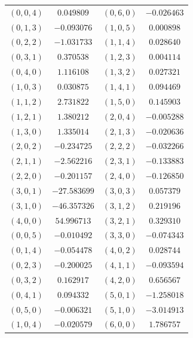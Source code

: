 \begin{table}
\begin{tabular}{cc@{\qquad}cc}
$(0,0,4)$ & $0.049809$ & $(0,6,0)$ & $-0.026463$ \\
$(0,1,3)$ & $-0.093076$ & $(1,0,5)$ & $0.000898$ \\
$(0,2,2)$ & $-1.031733$ & $(1,1,4)$ & $0.028640$ \\
$(0,3,1)$ & $0.370538$ & $(1,2,3)$ & $0.004114$ \\
$(0,4,0)$ & $1.116108$ & $(1,3,2)$ & $0.027321$ \\
$(1,0,3)$ & $0.030875$ & $(1,4,1)$ & $0.094469$ \\
$(1,1,2)$ & $2.731822$ & $(1,5,0)$ & $0.145903$ \\
$(1,2,1)$ & $1.380212$ & $(2,0,4)$ & $-0.005288$ \\
$(1,3,0)$ & $1.335014$ & $(2,1,3)$ & $-0.020636$ \\
$(2,0,2)$ & $-0.234725$ & $(2,2,2)$ & $-0.032266$ \\
$(2,1,1)$ & $-2.562216$ & $(2,3,1)$ & $-0.133883$ \\
$(2,2,0)$ & $-0.201157$ & $(2,4,0)$ & $-0.126850$ \\
$(3,0,1)$ & $-27.583699$ & $(3,0,3)$ & $0.057379$ \\
$(3,1,0)$ & $-46.357326$ & $(3,1,2)$ & $0.219196$ \\
$(4,0,0)$ & $54.996713$ & $(3,2,1)$ & $0.329310$ \\
$(0,0,5)$ & $-0.010492$ & $(3,3,0)$ & $-0.074343$ \\
$(0,1,4)$ & $-0.054478$ & $(4,0,2)$ & $0.028744$ \\
$(0,2,3)$ & $-0.200025$ & $(4,1,1)$ & $-0.093594$ \\
$(0,3,2)$ & $0.162917$ & $(4,2,0)$ & $0.656567$ \\
$(0,4,1)$ & $0.094332$ & $(5,0,1)$ & $-1.258018$ \\
$(0,5,0)$ & $-0.006321$ & $(5,1,0)$ & $-3.014913$ \\
$(1,0,4)$ & $-0.020579$ & $(6,0,0)$ & $1.786757$ \\
\hline
\end{tabular}
\end{table}

